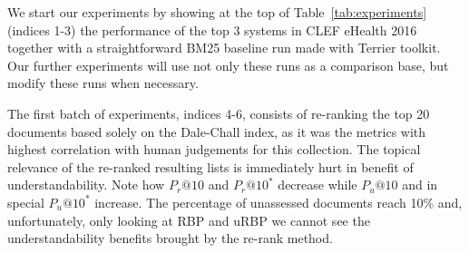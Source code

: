 %




We start our experiments by showing at the top of Table~\ref{tab:experiments} (indices 1-3) the performance of the top 3 systems in CLEF eHealth 2016 together with a straightforward BM25 baseline run made with Terrier toolkit. Our further experiments will use not only these runs as a comparison base, but modify these runs when necessary.

The first batch of experiments, indices 4-6, consists of re-ranking the top 20 documents based solely on the Dale-Chall index, as it was the metrics with highest correlation with human judgements for this collection.
The topical relevance of the re-ranked resulting lists is immediately hurt in benefit of understandability. Note how $P_r@10$ and $P_r@10^*$ decrease while $P_u@10$ and in special $P_u@10^*$ increase.
The percentage of unassessed documents reach 10\% and, unfortunately, only looking at RBP and uRBP we cannot see the understandability benefits brought by the re-rank method.

